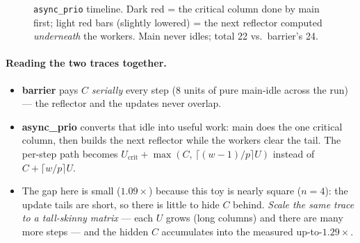 \documentclass[11pt]{article}
\newcommand{\code}[1]{\texttt{\small #1}}
\newcommand{\crit}[1]{\textcolor{critcol}{#1}}
\begin{document}
\begin{figure}[h]\centering
{}
\caption{\code{async\_prio} timeline. Dark red = the critical column done by main first;
light red bars (slightly lowered) = the next reflector computed \emph{underneath} the
workers. Main never idles; total 22 vs.\ barrier's 24.}
\end{figure}

\paragraph{Reading the two traces together.}
\begin{itemize}\itemsep2pt
\item \textbf{barrier} pays $C$ \emph{serially} every step (8 units of pure main-idle
across the run) --- the reflector and the updates never overlap.
\item \textbf{async\_prio} converts that idle into useful work: main does the one
critical column, then builds the next reflector while the workers clear the tail.
The per-step path becomes $U_{\text{crit}}+\max(C,\,\lceil(w{-}1)/p\rceil U)$ instead of
$C+\lceil w/p\rceil U$.
\item The gap here is small ($1.09\times$) because this toy is nearly square ($n{=}4$):
the update tails are short, so there is little to hide $C$ behind. \emph{Scale the same
trace to a tall-skinny matrix} --- each $U$ grows (long columns) and there are many more
steps --- and the hidden $C$ accumulates into the measured up-to-$1.29\times$.
\end{itemize}
\end{document}
